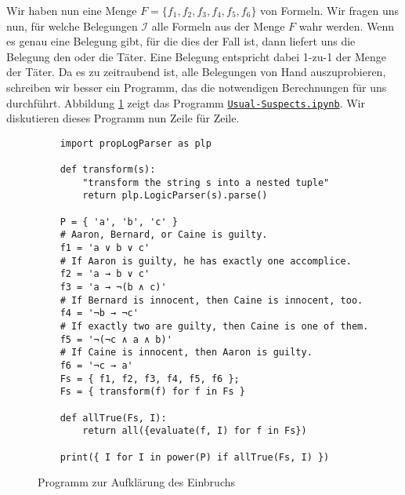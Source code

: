 Wir haben nun eine Menge $F = \{ f_1, f_2, f_3, f_4, f_5, f_6 \}$ von Formeln.
Wir fragen uns nun, für welche Belegungen $\mathcal{I}$ alle Formeln aus der Menge $F$ wahr werden.
Wenn es genau eine Belegung gibt, für die dies der Fall ist, dann liefert uns die
Belegung den oder die Täter.  Eine Belegung entspricht dabei 1-zu-1 der Menge der Täter.
Da es zu zeitraubend ist, alle Belegungen von Hand auszuprobieren,
schreiben wir besser ein Programm, das die notwendigen Berechnungen für uns durchführt.
Abbildung \ref{fig:Usual-Suspects.ipynb} zeigt das Programm
\href{https://github.com/karlstroetmann/Logic/blob/master/Python/Usual-Suspects.ipynb}{\texttt{Usual-Suspects.ipynb}}.
Wir diskutieren dieses Programm nun Zeile für Zeile.

\begin{figure}[!ht]
  \centering
\begin{verbatim}
    import propLogParser as plp

    def transform(s):
        "transform the string s into a nested tuple"
        return plp.LogicParser(s).parse()
    
    P = { 'a', 'b', 'c' }
    # Aaron, Bernard, or Caine is guilty.
    f1 = 'a ∨ b ∨ c'
    # If Aaron is guilty, he has exactly one accomplice.
    f2 = 'a → b ∨ c'
    f3 = 'a → ¬(b ∧ c)'
    # If Bernard is innocent, then Caine is innocent, too.
    f4 = '¬b → ¬c'
    # If exactly two are guilty, then Caine is one of them.
    f5 = '¬(¬c ∧ a ∧ b)'
    # If Caine is innocent, then Aaron is guilty.
    f6 = '¬c → a'
    Fs = { f1, f2, f3, f4, f5, f6 };
    Fs = { transform(f) for f in Fs }

    def allTrue(Fs, I):
        return all({evaluate(f, I) for f in Fs})

    print({ I for I in power(P) if allTrue(Fs, I) })
\end{verbatim}
\vspace*{-0.3cm}
  \caption{Programm zur Aufklärung des Einbruchs}
  \label{fig:Usual-Suspects.ipynb}
\end{figure}

